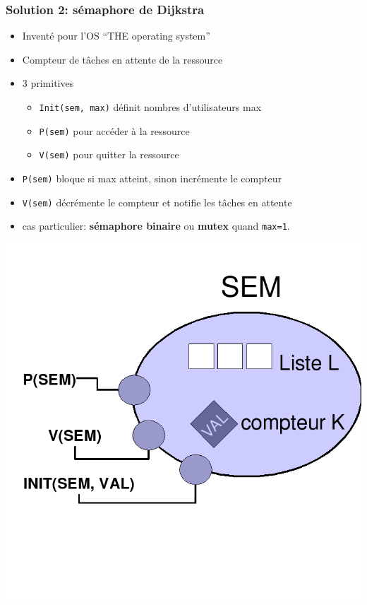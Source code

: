 \documentclass{beamer}
\begin{document}
\begin{frame}
  \frametitle{Solution 2: \textbf{sémaphore} de Dijkstra}
  \begin{minipage}{.7\textwidth}
    \begin{itemize}
    \item Inventé pour l'OS ``THE operating system''
    \item Compteur de tâches en attente de la ressource
    \item 3 primitives
      \begin{itemize}
      \item \texttt{Init(sem, max)} définit nombres d'utilisateurs max
      \item \texttt{P(sem)} pour accéder à la ressource
      \item \texttt{V(sem)} pour quitter la ressource
      \end{itemize}
    \item \texttt{P(sem)} bloque si max atteint, sinon incrémente le compteur
    \item \texttt{V(sem)} décrémente le compteur et notifie les tâches en
      attente
    \item cas particulier: \textbf{sémaphore binaire} ou \textbf{mutex} quand \texttt{max=1}.
    \end{itemize}
  \end{minipage}
  \begin{minipage}{.28\textwidth}
    \includegraphics[width=.7\textwidth]{semaphore.png}
  \end{minipage}
\end{frame} %
\end{document}
